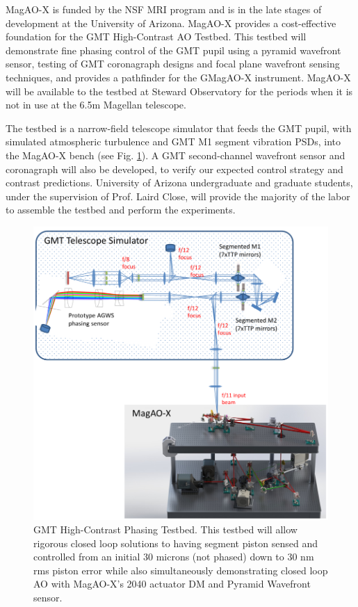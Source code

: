 \documentclass[12pt,preprint]{aastex}
\begin{document}
MagAO-X is funded by the NSF MRI program and is in the late stages of development at the University of Arizona. MagAO-X provides a cost-effective foundation for the GMT High-Contrast AO Testbed. This testbed will demonstrate fine phasing control of the GMT pupil using a pyramid wavefront sensor, testing of GMT coronagraph designs and focal plane wavefront sensing techniques, and provides a pathfinder for the GMagAO-X instrument. MagAO-X will be available to the testbed at Steward Observatory for the periods when it is not in use at the 6.5m Magellan telescope. 

The testbed is a narrow-field telescope simulator that feeds the GMT pupil, with simulated atmospheric turbulence and GMT M1 segment vibration PSDs, into the MagAO-X bench (see Fig. \ref{fig:testbed}). A GMT second-channel wavefront sensor and coronagraph will also be developed, to verify our expected control strategy and contrast predictions. University of Arizona undergraduate and graduate students, under the supervision of Prof. Laird Close, will provide the majority of the labor to assemble the testbed and perform the experiments.
 
 \begin{figure} [h!]
\centering
\includegraphics[width=5in]{figures/Testbed_figure.png}
\caption{GMT High-Contrast Phasing Testbed. This testbed will allow rigorous closed loop solutions to having segment piston sensed and controlled from an initial 30 microns (not phased) down to 30 nm rms piston error while also simultaneously demonstrating closed loop AO with MagAO-X's 2040 actuator DM and Pyramid Wavefront sensor.  \label{fig:testbed}}
\end{figure}
 
\end{document}
